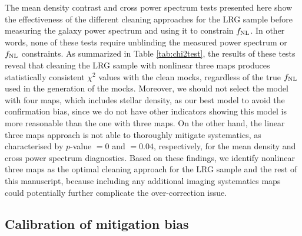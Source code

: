 The mean density contrast and cross power spectrum tests presented here show the effectiveness of the different cleaning approaches for the LRG sample before measuring the galaxy power spectrum and using it to constrain $f_{\rm NL}$. In other words, none of these tests require unblinding the measured power spectrum or $f_{\rm NL}$ constraints. As summarized in Table \ref{tab:chi2test}, the results of these tests reveal that cleaning the LRG sample with nonlinear three maps produces statistically consistent $\chi^{2}$ values with the clean mocks, regardless of the true $f_{\rm NL}$ used in the generation of the mocks. Moreover, we should not select the model with four maps, which includes stellar density, as our best model to avoid the confirmation bias, since we do not have other indicators showing this model is more reasonable than the one with three maps. On the other hand, the linear three maps approach is not able to thoroughly mitigate systematics, as characterised by $p$-value $=0$ and $=0.04$, respectively, for the mean density and cross power spectrum diagnostics. Based on these findings, we identify nonlinear three maps as the optimal cleaning approach for the LRG sample and the rest of this manuscript, because including any additional imaging systematics maps could potentially further complicate the over-correction issue.


\subsection{Calibration of mitigation bias}\label{ssec:calibration}

